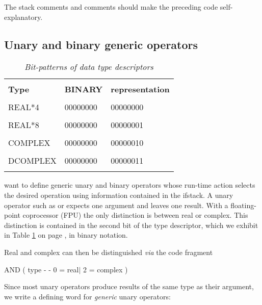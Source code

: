 The stack comments and comments should make the preceding code self-explanatory.

\subsection{Unary and binary generic operators}

\begin{table}
    \centering
    \caption{\textit{Bit-patterns of data type descriptors}}
        \bigskip
    \label{tbl:05_01}
    \setlength{\tabcolsep}{30pt}
        \begin{tabular}{|lll|}
            \hline
            & &\\
            \textbf{Type} & \textbf{BINARY} & \textbf{representation} \\
            & &\\
            REAL*4     &  00000000 & 00000000 \\
            & &\\
            REAL*8     &  00000000 & 00000001 \\
            & &\\
            COMPLEX    &  00000000 & 00000010 \\
            & &\\
            DCOMPLEX   &  00000000 & 00000011 \\
            & &\\
            \hline 
        \end{tabular}
\end{table}

 want to define generic unary and binary operators whose run-time action selects the desired operation using information contained in the ifstack. A unary operator such as  or  expects one argument and leaves one result. With a floating-point coprocessor (FPU) the only distinction is between real or complex. This distinction is contained in the second bit of the type descriptor, which we exhibit in Table \ref{tbl:05_01} on page \pageref{tbl:05_01}, in binary notation.

Real and complex can then be distinguished \textit{via} the code fragment

 AND ( type - - 0 = real$\mid$ 2 = complex )

Since most unary operators produce results of the same type as their argument, we write a defining word for \textit{generic} unary operators:

